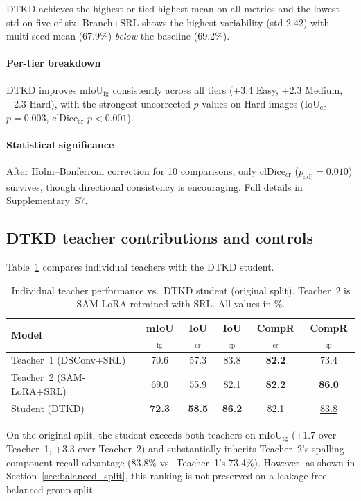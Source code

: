 \documentclass[review,authoryear]{elsarticle}
\begin{document}
DTKD achieves the highest or tied-highest mean on all metrics and the lowest std on five of six.
Branch+SRL shows the highest variability (std 2.42) with multi-seed mean (67.9\%) \emph{below} the baseline (69.2\%).

\paragraph{Per-tier breakdown}
DTKD improves mIoU$_{\text{fg}}$ consistently across all tiers (+3.4 Easy, +2.3 Medium, +2.3 Hard), with the strongest uncorrected $p$-values on Hard images (IoU$_{\text{cr}}$ $p{=}0.003$, clDice$_{\text{cr}}$ $p{<}0.001$).

\paragraph{Statistical significance}
After Holm--Bonferroni correction for 10 comparisons, only clDice$_{\text{cr}}$ ($p_{\text{adj}}{=}0.010$) survives, though directional consistency is encouraging. Full details in Supplementary~S7.

\subsection{DTKD teacher contributions and controls}

Table~\ref{tab:foundation} compares individual teachers with the DTKD student.

\begin{table}[t]
\centering
\caption{Individual teacher performance vs.\ DTKD student (original split). Teacher~2 is SAM-LoRA retrained with SRL. All values in \%.}
\label{tab:foundation}
\begin{tabular}{lccccc}
\toprule
Model & mIoU$_{\text{fg}}$ & IoU$_{\text{cr}}$ & IoU$_{\text{sp}}$ & CompR$_{\text{cr}}$ & CompR$_{\text{sp}}$ \\
\midrule
Teacher~1 (DSConv+SRL) & 70.6 & 57.3 & 83.8 & \textbf{82.2} & 73.4 \\
Teacher~2 (SAM-LoRA+SRL) & 69.0 & 55.9 & 82.1 & \textbf{82.2} & \textbf{86.0} \\
\midrule
Student (DTKD) & \textbf{72.3} & \textbf{58.5} & \textbf{86.2} & 82.1 & \underline{83.8} \\
\bottomrule
\end{tabular}
\end{table}

On the original split, the student exceeds both teachers on mIoU$_{\text{fg}}$ (+1.7 over Teacher~1, +3.3 over Teacher~2) and substantially inherits Teacher~2's spalling component recall advantage (83.8\% vs.\ Teacher~1's 73.4\%).
However, as shown in Section~\ref{sec:balanced_split}, this ranking is not preserved on a leakage-free balanced group split.
\end{document}
